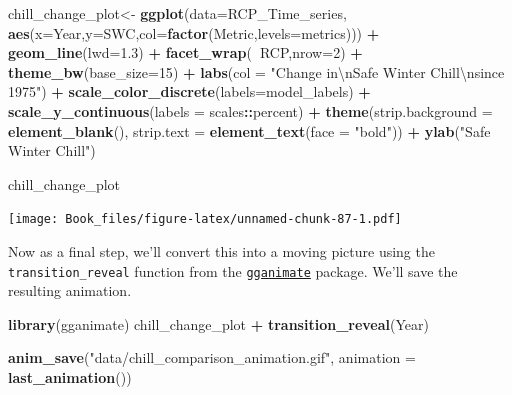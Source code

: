 \documentclass[
]{book}
\newenvironment{Shaded}{\begin{snugshade}}{\end{snugshade}}
\newcommand{\CharTok}[1]{\textcolor[rgb]{0.31,0.60,0.02}{#1}}
\newcommand{\DataTypeTok}[1]{\textcolor[rgb]{0.13,0.29,0.53}{#1}}
\newcommand{\DecValTok}[1]{\textcolor[rgb]{0.00,0.00,0.81}{#1}}
\newcommand{\FloatTok}[1]{\textcolor[rgb]{0.00,0.00,0.81}{#1}}
\newcommand{\KeywordTok}[1]{\textcolor[rgb]{0.13,0.29,0.53}{\textbf{#1}}}
\newcommand{\NormalTok}[1]{#1}
\newcommand{\OperatorTok}[1]{\textcolor[rgb]{0.81,0.36,0.00}{\textbf{#1}}}
\newcommand{\StringTok}[1]{\textcolor[rgb]{0.31,0.60,0.02}{#1}}
\begin{document}
\begin{Shaded}
\begin{Highlighting}[]
\NormalTok{chill_change_plot<-}
\StringTok{  }\KeywordTok{ggplot}\NormalTok{(}\DataTypeTok{data=}\NormalTok{RCP_Time_series,}
         \KeywordTok{aes}\NormalTok{(}\DataTypeTok{x=}\NormalTok{Year,}\DataTypeTok{y=}\NormalTok{SWC,}\DataTypeTok{col=}\KeywordTok{factor}\NormalTok{(Metric,}\DataTypeTok{levels=}\NormalTok{metrics))) }\OperatorTok{+}
\StringTok{  }\KeywordTok{geom_line}\NormalTok{(}\DataTypeTok{lwd=}\FloatTok{1.3}\NormalTok{) }\OperatorTok{+}
\StringTok{  }\KeywordTok{facet_wrap}\NormalTok{(}\OperatorTok{~}\NormalTok{RCP,}\DataTypeTok{nrow=}\DecValTok{2}\NormalTok{) }\OperatorTok{+}
\StringTok{  }\KeywordTok{theme_bw}\NormalTok{(}\DataTypeTok{base_size=}\DecValTok{15}\NormalTok{) }\OperatorTok{+}
\StringTok{  }\KeywordTok{labs}\NormalTok{(}\DataTypeTok{col =} \StringTok{"Change in}\CharTok{\textbackslash{}n}\StringTok{Safe Winter Chill}\CharTok{\textbackslash{}n}\StringTok{since 1975"}\NormalTok{) }\OperatorTok{+}
\StringTok{  }\KeywordTok{scale_color_discrete}\NormalTok{(}\DataTypeTok{labels=}\NormalTok{model_labels) }\OperatorTok{+}
\StringTok{  }\KeywordTok{scale_y_continuous}\NormalTok{(}\DataTypeTok{labels =}\NormalTok{ scales}\OperatorTok{::}\NormalTok{percent) }\OperatorTok{+}
\StringTok{  }\KeywordTok{theme}\NormalTok{(}\DataTypeTok{strip.background =} \KeywordTok{element_blank}\NormalTok{(),}
        \DataTypeTok{strip.text =} \KeywordTok{element_text}\NormalTok{(}\DataTypeTok{face =} \StringTok{"bold"}\NormalTok{)) }\OperatorTok{+}
\StringTok{  }\KeywordTok{ylab}\NormalTok{(}\StringTok{"Safe Winter Chill"}\NormalTok{)}

\NormalTok{chill_change_plot}
\end{Highlighting}
\end{Shaded}

\texttt{[image: Book\_files/figure-latex/unnamed-chunk-87-1.pdf]}

Now as a final step, we'll convert this into a moving picture using the \texttt{transition\_reveal} function from the \href{https://cran.r-project.org/web/packages/gganimate/gganimate.pdf}{\texttt{gganimate}} package. We'll save the resulting animation.

\begin{Shaded}
\begin{Highlighting}[]
\KeywordTok{library}\NormalTok{(gganimate)}
\NormalTok{chill_change_plot }\OperatorTok{+}\StringTok{ }\KeywordTok{transition_reveal}\NormalTok{(Year)}

\KeywordTok{anim_save}\NormalTok{(}\StringTok{"data/chill_comparison_animation.gif"}\NormalTok{, }\DataTypeTok{animation =} \KeywordTok{last_animation}\NormalTok{())}
\end{Highlighting}
\end{Shaded}
\end{document}
